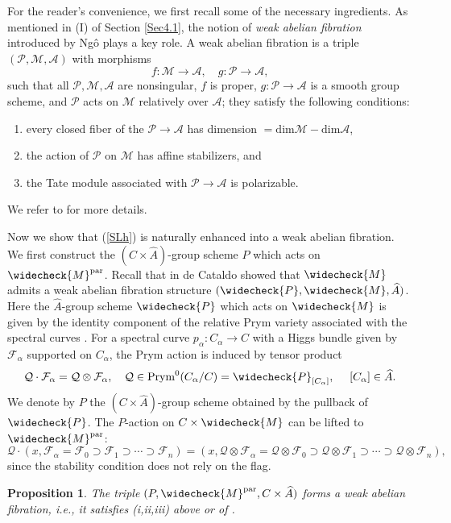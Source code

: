 \documentclass[11pt]{amsart}
\theoremstyle{plain}
\newtheorem{prop}[thm]{Proposition}
\theoremstyle{definition}
\theoremstyle{remark}
\newcommand{\CA}{{\mathcal A}}
\newcommand{\CF}{{\mathcal F}}
\newcommand{\CM}{{\mathcal M}}
\newcommand{\CP}{{\mathcal P}}
\newcommand{\CQ}{{\mathcal Q}}
\begin{document}
For the reader's convenience, we first recall some of the necessary ingredients. As mentioned in (I) of Section \ref{Sec4.1}, the notion of \emph{weak abelian fibration} introduced by Ng\^o \cite{Ngo} plays a key role. A weak abelian fibration is a triple $(\CP, \CM, \CA)$ with morphisms 
\[
f: \CM\to \CA, \quad g: \CP \to \CA,
\]
such that all $\CP, \CM, \CA$ are nonsingular, $f$ is proper, $g: \CP \to \CA$ is a smooth group scheme, and $\CP$ acts on $\CM$ relatively over $\CA$; they satisfy the following conditions:
\begin{enumerate}
    \item[(i)] every closed fiber of the $\CP \to \CA$ has dimension $= \mathrm{dim}\CM - \mathrm{dim}\CA$,
    \item[(ii)] the action of $\CP$ on $\CM$ has affine stabilizers, and
    \item[(iii)] the Tate module associated with $\CP \to \CA$ is polarizable.
\end{enumerate}
We refer to \cite[Section 1.1]{MS2} for more details.

Now we show that (\ref{SLh}) is naturally enhanced into a weak abelian fibration. We first construct the $(C\times \widehat{A})$-group scheme $P$ which acts on $\widecheck{M}^{\mathrm{par}}$. Recall that in \cite{dC_SL} de Cataldo showed that $\widecheck{M}$ admits a weak abelian fibration structure $(\widecheck{P}, \widecheck{M}, \widehat{A})$. Here the $\widehat{A}$-group scheme $\widecheck{P}$ which acts on $\widecheck{M}$ is given by the identity component of the relative Prym variety associated with the spectral curves \cite[(43)]{dC_SL}. For a spectral curve $p_\alpha: C_\alpha \to C$ with a Higgs bundle given by $\CF_\alpha$ supported on $C_\alpha$, the Prym action is induced by tensor product
\[
\CQ \cdot \CF_{\alpha} = \CQ \otimes \CF_\alpha, \quad \CQ \in \mathrm{Prym}^0(C_\alpha/C) = \widecheck{P}_{[C_\alpha]},~ \quad [C_\alpha] \in \widehat{A}. 
\]
We denote by $P$ the $(C\times \widehat{A})$-group scheme obtained by the pullback of $\widecheck{P}$. The $P$-action on $C\times \widecheck{M}$ can be lifted to $\widecheck{M}^{\mathrm{par}}$:
\[
\CQ \cdot (x, \CF_\alpha = \CF_0 \supset \CF_1 \supset \cdots \supset \CF_n) =  (x, \CQ\otimes\CF_\alpha = \CQ \otimes \CF_0 \supset \CQ\otimes\CF_1 \supset \cdots \supset \CQ \otimes \CF_n),
\] 
since the stability condition does not rely on the flag.


\begin{prop}\label{prop4.1}
The triple $(P, \widecheck{M}^{\mathrm{par}}, C\times \widehat{A})$ forms a weak abelian fibration, \emph{i.e.},  it satisfies (i,ii,iii) above or of \cite[Section 1.1]{MS2}.
\end{prop}
\end{document}
